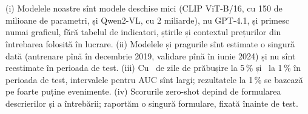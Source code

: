 \section{}
%
{(i) Modelele noastre sînt modele deschise mici (CLIP ViT-B/16, cu 150 de milioane de parametri, și Qwen2-VL, cu 2 miliarde), nu GPT-4.1, și primesc numai graficul, fără tabelul de indicatori, știrile și contextul prețurilor din întrebarea folosită în lucrare.
(ii) Modelele și pragurile sînt estimate o singură dată (antrenare pînă în decembrie 2019, validare pînă în iunie 2024) și nu sînt reestimate în perioada de test.
(iii) Cu \NcrashTest\ de zile de prăbușire la 5\,\% și \NcrashTestOne\ la 1\,\% în perioada de test, intervalele pentru AUC sînt largi; rezultatele la 1\,\% se bazează pe foarte puține evenimente.
(iv) Scorurile zero-shot depind de formularea descrierilor și a întrebării; raportăm o singură formulare, fixată înainte de test.}

\newpage
